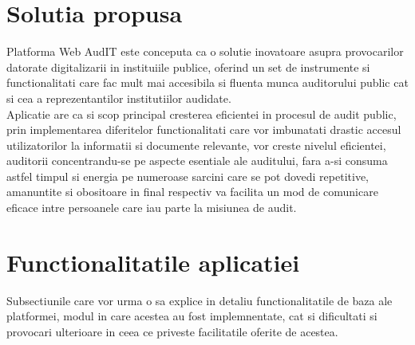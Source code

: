 \section{Solutia propusa}
Platforma Web AudIT este conceputa ca o solutie inovatoare asupra provocarilor datorate digitalizarii in instituiile publice, oferind un set de instrumente si functionalitati care fac mult mai accesibila si fluenta munca auditorului public cat si cea a reprezentantilor institutiilor audidate.\\
Aplicatie are ca si scop principal cresterea eficientei in procesul de audit public, prin implementarea diferitelor functionalitati care vor imbunatati drastic accesul utilizatorilor la informatii si documente relevante, vor creste nivelul eficientei, auditorii concentrandu-se pe aspecte esentiale ale auditului, fara a-si consuma  astfel timpul si energia pe numeroase sarcini care se pot dovedi repetitive, amanuntite si obositoare in final	respectiv va facilita un mod de comunicare eficace intre persoanele care iau parte la misiunea de audit.



\section{Functionalitatile aplicatiei}
Subsectiunile care vor urma o sa explice in detaliu functionalitatile de baza ale platformei,
modul in care acestea au fost implemnentate, cat si dificultati si provocari ulterioare in ceea ce priveste facilitatile oferite de acestea.

